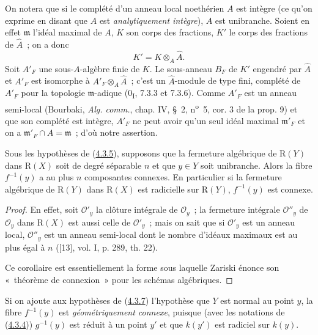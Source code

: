 On notera que si le complété d'un anneau local noethérien $A$ est intègre
(ce qu'on exprime en disant que $A$ est \emph{analytiquement intègre}), $A$
est unibranche. Soient en effet $\mathfrak m$ l'idéal maximal de $A$, $K$
son corps des fractions, $K'$ le corps des fractions de $\widehat A$~; on
a donc
\[
K'=K\otimes_A\widehat A.
\]
Soit $A'_F$ une sous-$A$-algèbre finie de $K$. Le sous-anneau $B_F$ de $K'$
engendré par $\widehat A$ et $A'_F$ est isomorphe à
$A'_F\otimes_A\widehat A$~; c'est un $\widehat A$-module de type fini,
complété de $A'_F$ pour la topologie $\mathfrak m$-adique
(0\textsubscript{I}, 7.3.3 et 7.3.6). Comme $A'_F$ est un anneau semi-local
(Bourbaki, \emph{Alg. comm.}, chap. IV, \S~2, n\textsuperscript{o}~5,
cor. 3 de la prop. 9) et que son complété est intègre, $A'_F$ ne peut avoir
qu'un seul idéal maximal $\mathfrak m'_F$ et on a
$\mathfrak m'_F\cap A=\mathfrak m$~; d'où notre assertion.

\begin{corollary}[4.3.7]
\label{III.4.3.7-fr}
Sous les hypothèses de (\hyperref[III.4.3.5-fr]{4.3.5}), supposons que la
fermeture algébrique de $\mathrm R(Y)$ dans $\mathrm R(X)$ soit de degré
séparable $n$ et que $y\in Y$ soit unibranche. Alors la fibre $f^{-1}(y)$ a
au plus $n$ composantes connexes. En particulier si la fermeture algébrique
de $\mathrm R(Y)$ dans $\mathrm R(X)$ est radicielle sur $\mathrm R(Y)$,
$f^{-1}(y)$ est connexe.
\end{corollary}

\begin{proof}
En effet, soit $\mathcal O'_y$ la clôture intégrale de $\mathcal O_y$~; la
fermeture intégrale $\mathcal O''_y$ de $\mathcal O_y$ dans $\mathrm R(X)$
est aussi celle de $\mathcal O'_y$~; mais on sait que si $\mathcal O'_y$ est
un anneau local, $\mathcal O''_y$ est un anneau semi-local dont le nombre
d'idéaux maximaux est au plus égal à $n$ ([13], vol. I, p. 289, th. 22).

Ce corollaire est essentiellement la forme sous laquelle Zariski énonce son
«~théorème de connexion~» pour les schémas algébriques.
\end{proof}

\begin{remark}[4.3.8]
\label{III.4.3.8-fr}
Si on ajoute aux hypothèses de (\hyperref[III.4.3.7-fr]{4.3.7}) l'hypothèse
que $Y$ est normal au point $y$, la fibre $f^{-1}(y)$ est
\emph{géométriquement connexe}, puisque (avec les notations de
(\hyperref[III.4.3.4-fr]{4.3.4})) $g^{-1}(y)$ est réduit à un point $y'$ et
que $k(y')$ est radiciel sur $k(y)$.
\end{remark}

